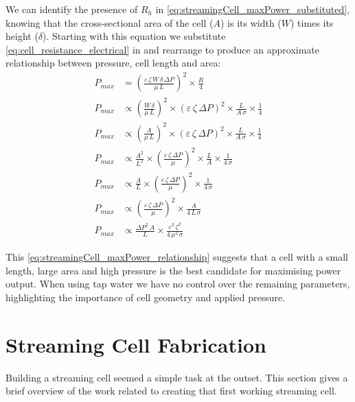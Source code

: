       We can identify the presence of $R_{h}$ in \cref{eq:streamingCell_maxPower_substituted}, knowing that the cross-sectional area of the cell ($A$) is its width ($W$) times its height ($\delta$).
      Starting with this equation we substitute \cref{eq:cell_resistance_electrical} in and rearrange to produce an approximate relationship between pressure, cell length and area:
      \begin{align}
          P_{max} & = \left(\frac{\varepsilon\,\zeta\,W\,\delta\,\Delta P}{\mu\,L}\right)^{2}\times\frac{R}{4}\nonumber\\
          P_{max} & \propto \left(\frac{W\,\delta}{\mu\,L}\right)^{2}\times\left(\varepsilon\,\zeta\,\Delta P\right)^{2}\times \frac{L}{A\,\sigma} \times\frac{1}{4}\nonumber\\
          P_{max} & \propto \left(\frac{A}{\mu\,L}\right)^{2}\times\left(\varepsilon\,\zeta\,\Delta P\right)^{2}\times \frac{L}{A\,\sigma} \times\frac{1}{4}\nonumber\\
          P_{max} & \propto \frac{A^{2}}{L^{2}}\times\left(\frac{\varepsilon\,\zeta\,\Delta P}{\mu}\right)^{2}\times \frac{L}{A} \times\frac{1}{4\,\sigma}\nonumber\\
          P_{max} & \propto \frac{A}{L}\times\left(\frac{\varepsilon\,\zeta\,\Delta P}{\mu}\right)^{2}\times\frac{1}{4\,\sigma}\nonumber\\
          P_{max} & \propto \left(\frac{\varepsilon\,\zeta\,\Delta P}{\mu}\right)^{2}\times\frac{A}{4\,L\,\sigma}\nonumber\\
          P_{max} & \propto \frac{\Delta P^{2}\,A}{L}\times \frac{\varepsilon^{2}\,\zeta^{2}}{4\,\mu^{2}\,\sigma}
          \label{eq:streamingCell_maxPower_relationship}
      \end{align}

      This \cref{eq:streamingCell_maxPower_relationship} suggests that a cell with a small length, large area and high pressure is the best candidate for maximising power output.
      When using tap water we have no control over the remaining parameters, highlighting the importance of cell geometry and applied pressure.


\section{Streaming Cell Fabrication}
  \label{sect:part1_energyHarvesting_buildingStreamingCells}


  Building a streaming cell seemed a simple task at the outset.
  This section gives a brief overview of the work related to creating that first working streaming cell.


